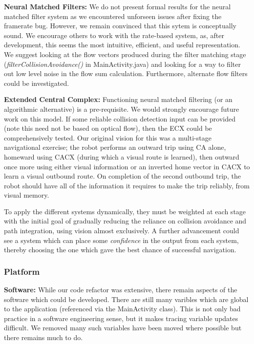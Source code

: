 \documentclass[a4paper,11pt,twoside,openright]{article}
\begin{document}
\textbf{Neural Matched Filters:} We do not present formal results
for the neural matched filter system as we encountered unforseen
issues after fixing the framerate bug. However, we remain convinced
that this sytem is conceptually sound. We encourage others to
work with the rate-based system, as, after development, this seems the
most intuitive, efficient, and useful representation. We
suggest looking at the flow vectors produced during the filter
matching stage (\textit{filterCollisionAvoidance()} in
MainActivity.java) and looking for a way to filter out low level
noise in the flow sum calculation. Furthermore, alternate flow filters
could be investigated.
\newline\par

\textbf{Extended Central Complex:} Functioning neural matched
filtering (or an algorithmic alternative) is a pre-requisite.
We would strongly encourage future work on this model. If some
reliable collision detection input can be provided (note this need not
be based on optical flow), then the ECX could be comprehensively
tested. Our original vision for this was a multi-stage navigational
exercise; the robot performs an outward trip using CA alone, homeward
using CACX (during which a visual route is learned), then outward once
more using either visual information or an inverted home vector in
CACX to learn a visual outbound route. On completion of the second
outbound trip, the robot should have all of the information it
requires to make the trip reliably, from visual memory. \newline\par

To apply the different systems dynamically, they must be weighted at
each stage with the initial goal of gradually reducing the reliance on
collision avoidance and path integration, using vision almost
exclusively. A further advancement could see a system which can place
some \textit{confidence} in the output from each system, thereby
choosing the one which gave the best chance of successful navigation.
\newline\par

\subsubsection{Platform}\label{sec:disc:platform}
\textbf{Software:} While our code refactor was extensive, there remain
aspects of the software which could be developed. There are still
many varibles which are global to the application (referenced via the
MainActivity class). This is not only bad practice in a software
engineering sense, but it makes tracing variable updates
difficult. We removed many such variables have been moved where possible but
there remains much to do.\newline\par
\end{document}

